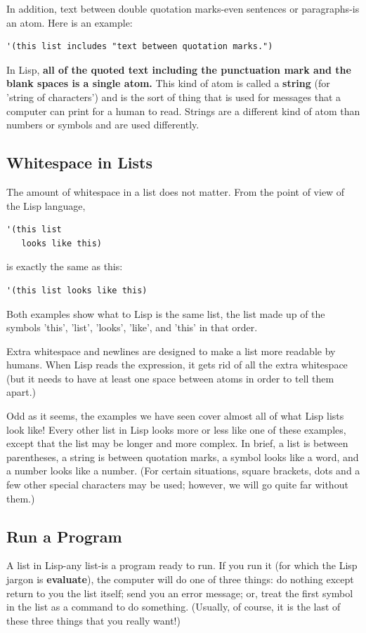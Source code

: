 \documentclass[12pt]{book}
\begin{document}
In addition, text between double quotation marks-even sentences or paragraphs-is an atom. Here is an example:
\begin{verbatim}
'(this list includes "text between quotation marks.")
\end{verbatim}
In Lisp, {\bf all of the quoted text including the punctuation mark and the blank spaces is a single atom.} This kind of atom is called a {\bf string} (for 'string of characters') and is the sort of thing that is used for messages that a computer can print for a human to read. Strings are a different kind of atom than numbers or symbols and are used differently.

















\subsection{Whitespace in Lists}
The amount of whitespace in a list does not matter. From the point of view of the Lisp language,
\begin{verbatim}
'(this list 
   looks like this)
\end{verbatim}
is exactly the same as this:
\begin{verbatim}
'(this list looks like this) 
\end{verbatim}
Both examples show what to Lisp is the same list, the list made up of the symbols 'this', 'list', 'looks', 'like', and 'this' in that order.

Extra whitespace and newlines are designed to make a list more readable by humans. When Lisp reads the expression, it gets rid of all the extra whitespace (but it needs to have at least one space between atoms in order to tell them apart.)

Odd as it seems, the examples we have seen cover almost all of what Lisp lists look like! Every other list in Lisp looks more or less like one of these examples, except that the list may be longer and more complex. In brief, a list is between parentheses, a string is between quotation marks, a symbol looks like a word, and a number looks like a number. (For certain situations, square brackets, dots and a few other special characters may be used; however, we will go quite far without them.)
\subsection{Run a Program}
A list in Lisp-any list-is a program ready to run. If you run it (for which the Lisp jargon is {\bf evaluate}), the computer will do one of three things: do nothing except return to you the list itself; send you an error message; or, treat the first symbol in the list as a command to do something. (Usually, of course, it is the last of these three things that you really want!)
\end{document}
